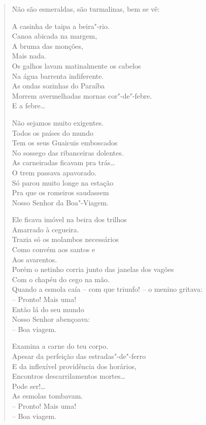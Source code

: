 {\begin{verse}
Não são esmeraldas, são turmalinas, bem se vê:

A casinha de taipa a beira"-rio.\\
Canoa abicada na margem,\\
A bruma das monções,\\
Mais nada.\\
Os galhos lavam matinalmente os cabelos\\
Na água barrenta indiferente.\\
As ondas sozinhas do Paraíba\\
Morrem avermelhadas mornas cor"-de"-febre.\\
E a febre\ldots{}

Não sejamos muito exigentes.\\
Todos os países do mundo\\
Tem os seus Guaicuis emboscados\\
No sossego das ribanceiras dolentes.\\
As carneiradas ficavam pra trás\ldots{}\\
O trem passava apavorado.\\
Só parou muito longe na estação\\
Pra que os romeiros saudassem\\
Nosso Senhor da Boa"-Viagem.

Ele ficava imóvel na beira dos trilhos\\
Amarrado à cegueira.\\
Trazia só os molambos necessários\\
Como convém aos santos e\\
Aos avarentos.\\
Porém o netinho corria junto das janelas dos vagões\\
Com o chapéu do cego na mão.\\
Quando a esmola caía -- com que triunfo! -- o menino gritava:\\
-- Pronto! Mais uma!\\
Então lá do seu mundo\\
Nosso Senhor abençoava:\\
-- Boa viagem.

Examina a carne do teu corpo.\\
Apesar da perfeição das estradas"-de"-ferro\\
E da inflexível providência dos horários,\\
Encontros descarrilamentos mortes\ldots{}\\
Pode ser!\ldots{}\\
As esmolas tombavam.\\
-- Pronto! Mais uma!\\
-- Boa viagem.


\end{verse}}
